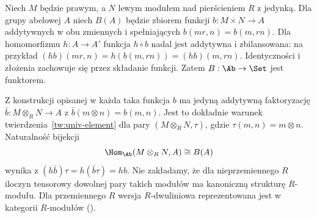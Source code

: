\begin{przyklad}\label{cat:ex:tensor-rep}
Niech $M$ będzie prawym, a $N$ lewym modułem nad pierścieniem $R$ z jedynką. Dla grupy abelowej $A$ niech $B(A)$ będzie zbiorem funkcji $b:M\times N\to A$ addytywnych w obu zmiennych i spełniających $b(mr,n)=b(m,rn)$. Dla homomorfizmu $h:A\to A'$ funkcja $h\circ b$ nadal jest addytywna i zbilansowana: na przykład
$(hb)(mr,n)=h(b(m,rn))=(hb)(m,rn)$.
Identyczności i złożenia zachowuje się przez składanie funkcji. Zatem $B:\Ab\to\Set$ jest funktorem.

Z konstrukcji opisanej w  każda taka funkcja $b$ ma jedyną addytywną faktoryzację $\bar b:M\otimes_R N\to A$ z $\bar b(m\otimes n)=b(m,n)$. Jest to dokładnie warunek twierdzenia~\ref{tw:univ-element} dla pary $(M\otimes_R N,\tau)$, gdzie $\tau(m,n)=m\otimes n$. Naturalność bijekcji
\[
\Hom_{\Ab}(M\otimes_R N,A)\cong B(A)
\]
wynika z $(h\bar b)\tau=h(\bar b\tau)=hb$. Nie zakładamy, że dla nieprzemiennego $R$ iloczyn tensorowy dowolnej pary takich modułów ma kanoniczną strukturę $R$-modułu. Dla przemiennego $R$ wersja $R$-dwuliniowa reprezentowana jest w kategorii $R$-modułów ().
\end{przyklad}

